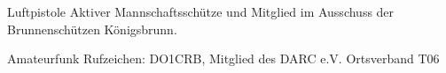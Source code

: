 


\begin{cvskills}


\cvskill
{Luftpistole}
{Aktiver Mannschaftsschütze und Mitglied im Ausschuss der Brunnenschützen Königsbrunn.}

\cvskill
{Amateurfunk} %
{Rufzeichen: DO1CRB, Mitglied des DARC e.V. Ortsverband T06} %


\end{cvskills}
